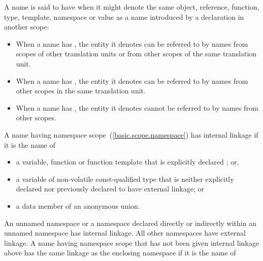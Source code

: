 \pnum
{}%
%
%
%
A name is said to have  when it might denote the same
object, reference, function, type, template, namespace or value as a
name introduced by a declaration in another scope:

\begin{itemize}
\item When a name has ,
the entity it denotes
can be referred to by names from scopes of other translation units or
from other scopes of the same translation unit.

\item When a name has ,
the entity it denotes
can be referred to by names from other scopes in the same translation
unit.

\item When a name has , the entity it denotes
cannot be referred to by names from other scopes.
\end{itemize}

\pnum
{}%
%
%
%
%
%
A name having namespace scope~(\ref{basic.scope.namespace}) has internal
linkage if it is the name of

\begin{itemize}
\item a variable, function or function template that is
explicitly declared ; or,

\item a variable of non-volatile const-qualified type that is
neither explicitly declared  nor previously
declared to have external linkage; or

\item a data member of an anonymous union.
\end{itemize}

\pnum
An unnamed namespace or a namespace declared directly or indirectly within an
unnamed namespace has internal linkage. All other namespaces have external linkage.
A name having namespace scope
that has not been given internal linkage above
has the same linkage as the enclosing namespace if it is the name of

